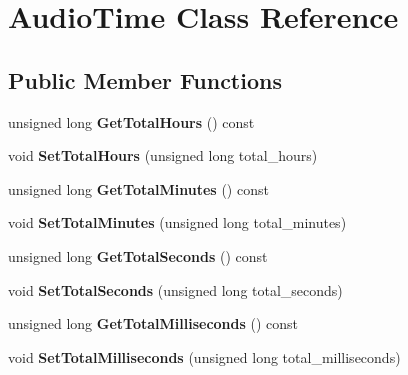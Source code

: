 \hypertarget{class_audio_time}{}\section{Audio\+Time Class Reference}
\label{class_audio_time}
\subsection*{Public Member Functions}
\begin{DoxyCompactItemize}
\item 
\mbox{\label{class_audio_time_accdc766a7c7e97fe97f0eabb810d3013}} 
unsigned long {\bfseries Get\+Total\+Hours} () const
\item 
\mbox{\label{class_audio_time_a5369d1596ed5975ebdcd76bb133d2a21}} 
void {\bfseries Set\+Total\+Hours} (unsigned long total\+\_\+hours)
\item 
\mbox{\label{class_audio_time_a5e50e533ee0347b8556f10b9cb4b2dca}} 
unsigned long {\bfseries Get\+Total\+Minutes} () const
\item 
\mbox{\label{class_audio_time_a2599d1e053612eb294a4e39698dbd42b}} 
void {\bfseries Set\+Total\+Minutes} (unsigned long total\+\_\+minutes)
\item 
\mbox{\label{class_audio_time_aeff03126a4fe7447dbfbbec8a994b524}} 
unsigned long {\bfseries Get\+Total\+Seconds} () const
\item 
\mbox{\label{class_audio_time_aa230e9a508e7278fbda44bf221602b3f}} 
void {\bfseries Set\+Total\+Seconds} (unsigned long total\+\_\+seconds)
\item 
\mbox{\label{class_audio_time_a7e819a91147f6ff3ce9fbd78ea245799}} 
unsigned long {\bfseries Get\+Total\+Milliseconds} () const
\item 
\mbox{\label{class_audio_time_a97433270bfbf451b515213f9b5f06db0}} 
void {\bfseries Set\+Total\+Milliseconds} (unsigned long total\+\_\+milliseconds)
\item 
\mbox{\label{class_audio_time_a346c892a582e313c445048a6d46ead15}} 

\end{DoxyCompactItemize}
